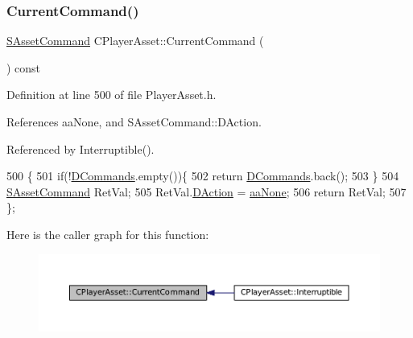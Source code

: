 \subsubsection{\texorpdfstring{Current\+Command()}{CurrentCommand()}}
{\footnotesize\ttfamily \hyperlink{structSAssetCommand}{S\+Asset\+Command} C\+Player\+Asset\+::\+Current\+Command (\begin{DoxyParamCaption}{ }\end{DoxyParamCaption}) const\hspace{0.3cm}{\ttfamily [inline]}}



Definition at line 500 of file Player\+Asset.\+h.



References aa\+None, and S\+Asset\+Command\+::\+D\+Action.



Referenced by Interruptible().


\begin{DoxyCode}
500                                             \{
501             \textcolor{keywordflow}{if}(!\hyperlink{classCPlayerAsset_a4d3b96106d3b1c1020f98005884d2a87}{DCommands}.empty())\{
502                 \textcolor{keywordflow}{return} \hyperlink{classCPlayerAsset_a4d3b96106d3b1c1020f98005884d2a87}{DCommands}.back();
503             \}
504             \hyperlink{structSAssetCommand}{SAssetCommand} RetVal;
505             RetVal.\hyperlink{structSAssetCommand_a8edd3b3d59a76d5514ba403bc8076a75}{DAction} = \hyperlink{GameDataTypes_8h_ab47668e651a3032cfb9c40ea2d60d670ac17cc5a0035320c060d7f8074143b507}{aaNone};
506             \textcolor{keywordflow}{return} RetVal;
507         \};
\end{DoxyCode}
Here is the caller graph for this function\+:\nopagebreak
\begin{figure}[H]
\begin{center}
\leavevmode
\includegraphics[width=350pt]{classCPlayerAsset_ae2040e12e5319593c9a2d724c7b7eda0_icgraph}
\end{center}
\end{figure}
\hypertarget{classCPlayerAsset_ab29218b9af24ca9db186ee36f75ae7d4}{}\label{classCPlayerAsset_ab29218b9af24ca9db186ee36f75ae7d4} 
